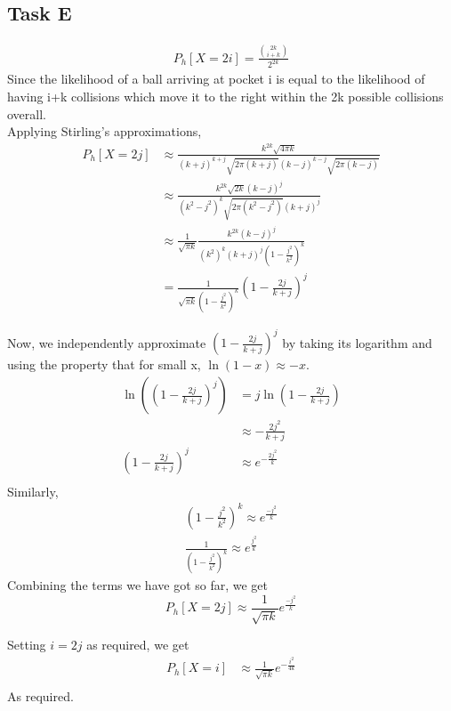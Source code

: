 \subsection{Task E}
\begin{align*}
    P_h[X=2i]=\frac{{{2k}\choose{i+k}}}{2^{2k}}
\end{align*}
Since the likelihood of a ball arriving at pocket i is equal to the likelihood of having i+k collisions which move it to the right within the 2k possible collisions overall.\\
Applying Stirling's approximations,
\begin{align*}
    P_h[X=2j] &\approx \frac{k^{2k}\sqrt{4\pi k}}{(k+j)^{k+j}\sqrt{2\pi (k+j)}(k-j)^{k-j}\sqrt{2\pi (k-j)}}\\
    &\approx \frac{k^{2k}\sqrt{2k}(k-j)^j}{(k^2-j^2)^{k}\sqrt{2\pi (k^2-j^2)}(k+j)^j}\\
    &\approx \frac{1}{\sqrt{\pi k}}\frac{k^{2k}(k-j)^{j}}{(k^2)^k(k+j)^{j}\left(1-\frac{j^2}{k^2}\right)^k} \\
    &= \frac{1}{\sqrt{\pi k}\left(1-\frac{j^2}{k^2}\right)^k}\left(1-\frac{2j}{k+j}\right)^j
\end{align*}

Now, we independently approximate $\left(1-\frac{2j}{k+j}\right)^j$ by taking its logarithm and using the property that for small x, $\ln(1-x) \approx -x$.
\begin{align*}
    \ln\left(\left(1-\frac{2j}{k+j}\right)^j\right) &= j\ln\left(1-\frac{2j}{k+j}\right)\\
    &\approx -\frac{2j^2}{k+j}\\
    \left(1-\frac{2j}{k+j}\right)^j&\approx e^{-\frac{2j^2}{k}}\\
\end{align*}
Similarly, 
\begin{align}
    \left(1-\frac{j^2}{k^2}\right)^k \approx e^{\frac{-j^2}{k}}\\
    \frac{1}{\left(1-\frac{j^2}{k^2}\right)^k} \approx e^{\frac{j^2}{k}}
\end{align}
Combining the terms we have got so far, we get
\[
    P_h[X=2j]\approx \frac{1}{\sqrt{\pi k}}e^{\frac{-j^2}{k}}
\]

Setting $i=2j$ as required, we get 
\begin{align*}
    P_h[X=i]&\approx \frac{1}{\sqrt{\pi k}}e^{-\frac{i^2}{4k}}\\
\end{align*}
As required.